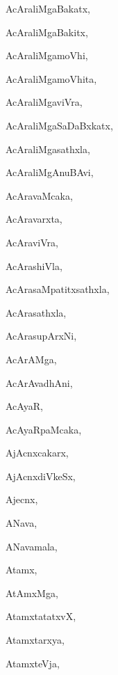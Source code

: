 \begin{multicols}{3}
{\noindent
{AcAraliMgaBakatx}, \pageref{AcAraliMgaBakatx}

\noindent
{AcAraliMgaBakitx}, \pageref{AcAraliMgaBakitx}

\noindent
{AcAraliMgamoVhi}, \pageref{AcAraliMgamoVhi}

\noindent
{AcAraliMgamoVhita}, \pageref{AcAraliMgamoVhita}

\noindent
{AcAraliMgaviVra}, \pageref{AcAraliMgaviVra}

\noindent
{AcAraliMgaSaDaBxkatx}, \pageref{AcAraliMgaSaDaBxkatx}

\noindent
{AcAraliMgasathxla}, \pageref{AcAraliMgasathxla}

\noindent
{AcAraliMgAnuBAvi}, \pageref{AcAraliMgAnuBAvi}

\noindent
{AcAravaMcaka}, \pageref{AcAravaMcaka}

\noindent
{AcAravarxta}, \pageref{AcAravarxta}

\noindent
{AcAraviVra}, \pageref{AcAraviVra}

\noindent
{AcArashiVla}, \pageref{AcArashiVla}

\noindent
{AcArasaMpatitxsathxla}, \pageref{AcArasaMpatitxsathxla}

\noindent
{AcArasathxla}, \pageref{AcArasathxla}

\noindent
{AcArasupArxNi}, \pageref{AcArasupArxNi}

\noindent
{AcArAMga}, \pageref{AcArAMga}

\noindent
{AcArAvadhAni}, \pageref{AcArAvadhAni}

\noindent
{AcAyaR}, \pageref{AcAyaR}

\noindent
{AcAyaRpaMcaka}, \pageref{AcAyaRpaMcaka}

\noindent
{AjAcnxcakarx}, \pageref{AjAcnxcakarx}

\noindent
{AjAcnxdiVkeSx}, \pageref{AjAcnxdiVkeSx}

\noindent
{Ajecnx}, \pageref{Ajecnx}

\noindent
{ANava}, \pageref{ANava}

\noindent
{ANavamala}, \pageref{ANavamala}

\noindent
{Atamx}, \pageref{Atamx}

\noindent
{AtAmxMga}, \pageref{AtAmxMga}

\noindent
{AtamxtatatxvX}, \pageref{AtamxtatatxvX}

\noindent
{Atamxtarxya}, \pageref{Atamxtarxya}

\noindent
{AtamxteVja}, \pageref{AtamxteVja}

}
\end{multicols}
